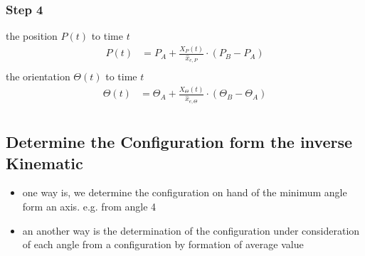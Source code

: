 \documentclass[%
  professionalfonts,%
  xcolor={%
    usenames,%
    dvipsnames,%
    svgnames,%
    table,%
    hyperref%
  }%
]{beamer}
\begin{document}
\subsubsection{Step 4}
\begin{frame}
the position $P(t)$ to time $t$
\begin{align*}
P(t) & = P_{A} + \frac{X_{P}(t)}{\hat{x}_{e,P}} \cdot \left(P_{B} - P_{A} \right)\\
\end{align*}
the orientation $\Theta(t)$ to time $t$
\begin{align*}
\Theta(t) & = \Theta_{A} + \frac{X_{\Theta}(t)}{\hat{x}_{e,\Theta}} \cdot \left(\Theta_{B} - \Theta_{A} \right)\\
\end{align*}
\end{frame}


\subsection{Determine the Configuration form the inverse Kinematic}
\begin{frame}
\begin{itemize}
\item one way is, we determine the configuration on hand of the minimum angle form an axis. e.g. from angle 4 \\
\end{itemize}


\end{frame}

\begin{frame}
\begin{itemize}
  \item an another way is the determination of the configuration under consideration of each angle from a configuration by formation of average value
\end{itemize}


\end{frame}
\end{document}
